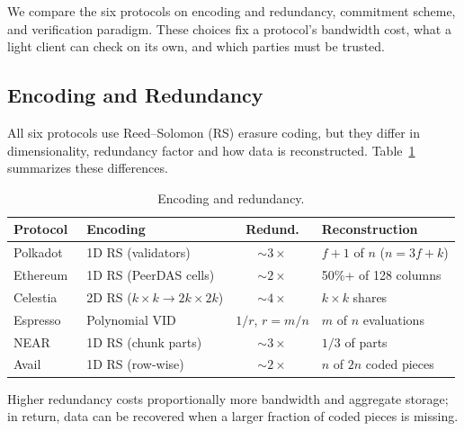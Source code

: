 
We compare the six protocols on encoding and redundancy, commitment scheme, and verification paradigm.
These choices fix a protocol's bandwidth cost, what a light client can check on its own, and which parties must be trusted.

\subsection{Encoding and Redundancy}
\label{subsec:encoding}

All six protocols use Reed--Solomon (RS) erasure coding, but they differ in dimensionality, redundancy factor and how data is reconstructed.
Table~\ref{tab:encoding_comparison} summarizes these differences.

\begin{table}[t]
\centering
\caption{Encoding and redundancy.}
\label{tab:encoding_comparison}
\setlength{\tabcolsep}{2pt}
\footnotesize
\begin{tabular}{l l c l}
\toprule
\textbf{Protocol} & \textbf{Encoding} & \textbf{Redund.} & \textbf{Reconstruction} \\
\midrule
Polkadot~\cite{Jeff_Burdges_ELVES} & 1D RS (validators) & ${\sim}3\times$ & $f{+}1$ of $n$ ($n{=}3f{+}k$) \\
Ethereum~\cite{EIP-7594} & 1D RS (PeerDAS cells) & ${\sim}2\times$ & 50\%+ of 128 columns \\
Celestia~\cite{AlBassam_LazyLedger} & 2D RS ($k \times k \to 2k \times 2k$) & ${\sim}4\times$ & $k{\times}k$ shares \\
Espresso~\cite{Espresso:Hotshot_and_Triamisu} & Polynomial VID & $1/r$, $r{=}m/n$ & $m$ of $n$ evaluations \\
NEAR~\cite{NEAR_Nightshade_Scaling_Blockchain} & 1D RS (chunk parts) & ${\sim}3\times$ & $1/3$ of parts \\
Avail~\cite{Avail_The_DA_Blockchain} & 1D RS (row-wise) & ${\sim}2\times$ & $n$ of $2n$ coded pieces \\
\bottomrule
\end{tabular}
\end{table}

Higher redundancy costs proportionally more bandwidth and aggregate storage; in return, data can be recovered when a larger fraction of coded pieces is missing.

